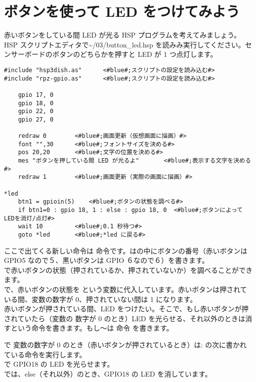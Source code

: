 \newpage
\section{ボタンを使って LED をつけてみよう}
赤いボタンをしている間 LED が光る HSP プログラムを考えてみましょう。HSP スクリプトエディタで\textasciitilde /03/button\_led.hsp を読みみ実行してください。センサーボードのボタンのどちらかを押すと LED が 1 つ点灯します。\\

\begin{lstlisting}[caption=\textasciitilde/03/button\_led.hsp,label=button_led.hsp]
#include "hsp3dish.as"		<#blue#;スクリプトの設定を読み込む#>
#include "rpz-gpio.as"		<#blue#;スクリプトの設定を読み込む#>

	gpio 17, 0
	gpio 18, 0
	gpio 22, 0
	gpio 27, 0
   
	redraw 0		<#blue#;画面更新（仮想画面に描画）#>
	font "",30		<#blue#;フォントサイズを決める#>
	pos 20,20		<#blue#;文字の位置を決める#>
	mes "ボタンを押している間 LED が光るよ"		<#blue#;表示する文字を決める#>
	redraw 1		<#blue#;画面更新（実際の画面に描画）#>

*led
	btn1 = gpioin(5) 	<#blue#;ボタンの状態を調べる#>
	if btn1=0 : gpio 18, 1 : else : gpio 18, 0 	<#blue#;ボタンによってLEDを消灯/点灯#>
	wait 10 		<#blue#;0.1 秒待つ#>
	goto *led 		<#blue#;*led に戻る#>
\end{lstlisting}

ここで出てくる新しい命令は  命令です。は\code{()}の中にボタンの番号（赤いボタンは
GPIO5 なので５、黒いボタンは GPIO ６なので６）を書きます。\\

で赤いボタンの状態（押されているか、押されていないか）を調べることができます。\\
で、赤いボタンの状態を  という変数に代入しています。赤いボタンは押されている間、変数の数字が 0、押されていない間は 1 になります。\\

赤いボタンが押されている間、LED をつけたい。そこで、もし赤いボタンが押されていたら（変数の
数字が 0 のとき）LED を光らせる、それ以外のときは消すという命令を書きます。もし～は  命令
を書きます。

 で  変数の数字が 0 のとき（赤いボタンが押されているとき）は\code{ }: の次に書かれている命令を実行します。\\
 で GPIO18 の LED を光らせます。\\
 では、else（それ以外）のとき、GPIO18 の LED を消しています。\\

